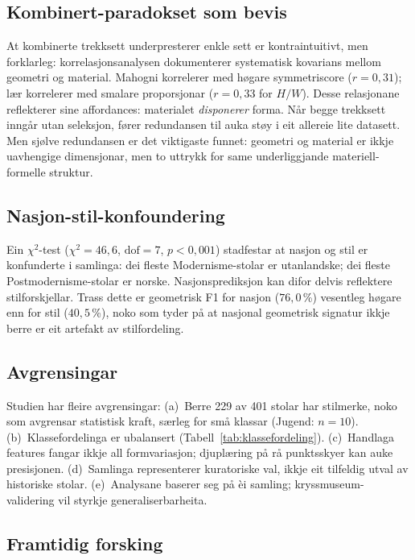 \documentclass[12pt,a4paper]{article}
\begin{document}
\subsection{Kombinert-paradokset som bevis}

At kombinerte trekksett underpresterer enkle sett er kontraintuitivt, men forklarleg: korrelasjonsanalysen dokumenterer systematisk kovarians mellom geometri og material. Mahogni korrelerer med h\o{}gare symmetriscore ($r = 0{,}31$); l\ae{}r korrelerer med smalare proporsjonar ($r = 0{,}33$ for $H/W$). Desse relasjonane reflekterer \citet{gibson1977} sine affordances: materialet \emph{disponerer} forma. N\aa{}r begge trekksett inng\aa{}r utan seleksjon, f\o{}rer redundansen til auka st\o{}y i eit allereie lite datasett. Men sj\o{}lve redundansen er det viktigaste funnet: geometri og material er ikkje uavhengige dimensjonar, men to uttrykk for same underliggjande materiell-formelle struktur.

\subsection{Nasjon-stil-konfoundering}

Ein $\chi^2$-test ($\chi^2 = 46{,}6$, $\text{dof} = 7$, $p < 0{,}001$) stadfestar at nasjon og stil er konfunderte i samlinga: dei fleste Modernisme-stolar er utanlandske; dei fleste Postmodernisme-stolar er norske. Nasjonsprediksjon kan difor delvis reflektere stilforskjellar. Trass dette er geometrisk F1 for nasjon ($76{,}0$\,\%) vesentleg h\o{}gare enn for stil ($40{,}5$\,\%), noko som tyder p\aa{} at nasjonal geometrisk signatur ikkje berre er eit artefakt av stilfordeling.

\subsection{Avgrensingar}

Studien har fleire avgrensingar: (a)~Berre 229 av 401 stolar har stilmerke, noko som avgrensar statistisk kraft, s\ae{}rleg for sm\aa{} klassar (Jugend: $n=10$). (b)~Klassefordelinga er ubalansert (Tabell~\ref{tab:klassefordeling}). (c)~Handlaga features fangar ikkje all formvariasjon; djupl\ae{}ring p\aa{} r\aa{} punktsskyer kan auke presisjonen. (d)~Samlinga representerer kuratoriske val, ikkje eit tilfeldig utval av historiske stolar. (e)~Analysane baserer seg p\aa{} \`{e}i samling; kryssmuseum-validering vil styrkje generaliserbarheita.

\subsection{Framtidig forsking}
\end{document}
